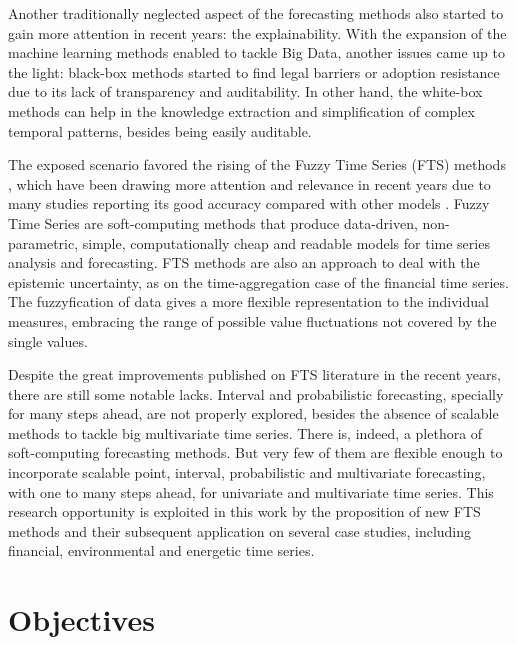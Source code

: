 Another traditionally neglected aspect of the forecasting methods also started to gain more attention in recent years: the explainability. With the expansion of the machine learning methods enabled to tackle Big Data, another issues came up to the light: black-box methods started to find legal barriers or adoption resistance due to its lack of transparency and auditability. In other hand, the white-box methods can help in the knowledge extraction and simplification of complex temporal patterns, besides being easily auditable.

The exposed scenario favored the rising of the Fuzzy Time Series (FTS) methods \cite{song1993fuzzy}, which have been drawing more  attention and relevance in recent years due to many studies reporting its good accuracy compared with other models \cite{Singh2008}. Fuzzy Time Series are soft-computing methods that produce data-driven, non-parametric, simple, computationally cheap and readable models for time series analysis and forecasting. FTS methods are also an approach to deal with  the  epistemic uncertainty, as on the time-aggregation case of the financial time series. The fuzzyfication of data gives a more flexible representation to the individual measures, embracing the range of possible value fluctuations not covered by the single values. 

Despite the great improvements published on FTS literature in the recent years, there are still some notable lacks. Interval and probabilistic forecasting, specially for many steps ahead, are not properly explored, besides the absence of scalable methods to tackle big multivariate time series. There is, indeed, a plethora of soft-computing forecasting methods. But very few of them are flexible enough to incorporate scalable point, interval, probabilistic and multivariate forecasting, with one to many steps ahead, for univariate and multivariate time series. This research opportunity is exploited in this work by the proposition of new FTS methods and their subsequent application on several case studies, including financial, environmental and energetic time series. 

\section{Objectives}  

